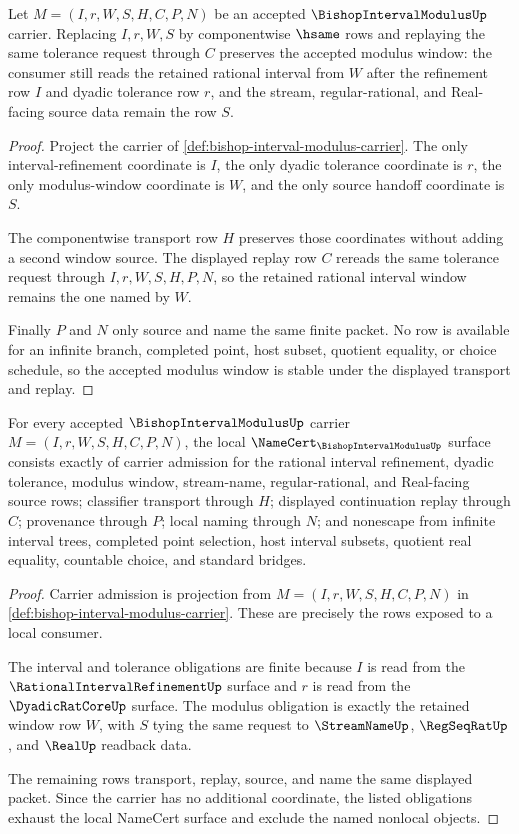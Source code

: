 \begin{theorem}
\label{thm:bishop-interval-modulus-window-stability}
Let $M=(I,r,W,S,H,C,P,N)$ be an accepted $\BishopIntervalModulusUp$ carrier. Replacing $I,r,W,S$ by componentwise $\hsame$ rows and replaying the same tolerance request through $C$ preserves the accepted modulus window: the consumer still reads the retained rational interval from $W$ after the refinement row $I$ and dyadic tolerance row $r$, and the stream, regular-rational, and Real-facing source data remain the row $S$.
\end{theorem}
\begin{proof}
Project the carrier of \autoref{def:bishop-interval-modulus-carrier}. The only interval-refinement coordinate is $I$, the only dyadic tolerance coordinate is $r$, the only modulus-window coordinate is $W$, and the only source handoff coordinate is $S$.

The componentwise transport row $H$ preserves those coordinates without adding a second window source. The displayed replay row $C$ rereads the same tolerance request through $I,r,W,S,H,P,N$, so the retained rational interval window remains the one named by $W$.

Finally $P$ and $N$ only source and name the same finite packet. No row is available for an infinite branch, completed point, host subset, quotient equality, or choice schedule, so the accepted modulus window is stable under the displayed transport and replay.
\end{proof}

\begin{theorem}
\label{thm:bishop-interval-modulus-namecert-obligations}
For every accepted $\BishopIntervalModulusUp$ carrier $M=(I,r,W,S,H,C,P,N)$, the local $\NameCert_{\BishopIntervalModulusUp}$ surface consists exactly of carrier admission for the rational interval refinement, dyadic tolerance, modulus window, stream-name, regular-rational, and Real-facing source rows; classifier transport through $H$; displayed continuation replay through $C$; provenance through $P$; local naming through $N$; and nonescape from infinite interval trees, completed point selection, host interval subsets, quotient real equality, countable choice, and standard bridges.
\end{theorem}
\begin{proof}
Carrier admission is projection from $M=(I,r,W,S,H,C,P,N)$ in \autoref{def:bishop-interval-modulus-carrier}. These are precisely the rows exposed to a local consumer.

The interval and tolerance obligations are finite because $I$ is read from the $\RationalIntervalRefinementUp$ surface and $r$ is read from the $\DyadicRatCoreUp$ surface. The modulus obligation is exactly the retained window row $W$, with $S$ tying the same request to $\StreamNameUp$, $\RegSeqRatUp$, and $\RealUp$ readback data.

The remaining rows transport, replay, source, and name the same displayed packet. Since the carrier has no additional coordinate, the listed obligations exhaust the local NameCert surface and exclude the named nonlocal objects.
\end{proof}

